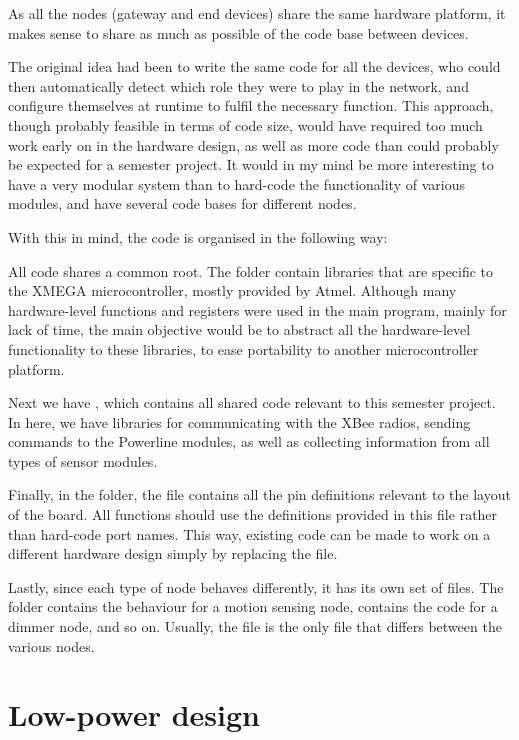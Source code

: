 As all the nodes (gateway and end devices) share the same hardware platform, it
makes sense to share as much as possible of the code base between devices.

The original idea had been to write the same code for all the devices, who could
then automatically detect which role they were to play in the network, and
configure themselves at runtime to fulfil the necessary function. This approach,
though probably feasible in terms of code size, would have required too much
work early on in the hardware design, as well as more code than could probably
be expected for a semester project. It would in my mind be more interesting to
have a very modular system than to hard-code the functionality of various
modules, and have several code bases for different nodes.

With this in mind, the code is organised in the following way:


All code shares a common root. The folder  contain libraries
that are specific to the XMEGA microcontroller, mostly provided by Atmel.
Although many hardware-level functions and registers were used in the main
program, mainly for lack of time, the main objective would be to abstract all
the hardware-level functionality to these libraries, to ease portability to
another microcontroller platform.

Next we have , which contains all shared code relevant to
this semester project. In here, we have libraries for communicating with the
XBee radios, sending commands to the Powerline modules, as well as collecting
information from all types of sensor modules.

Finally, in the  folder, the  file contains
all the pin definitions relevant to the layout of the board. All functions
should use the definitions provided in this file rather than hard-code port
names. This way, existing code can be made to work on a different hardware
design simply by replacing the  file.

Lastly, since each type of node behaves differently, it has its own set of
files. The  folder contains the behaviour for a motion
sensing node,  contains the code for a dimmer node, and so
on. Usually, the  file is the only file that differs between the
various nodes.

\section{Low-power design}

